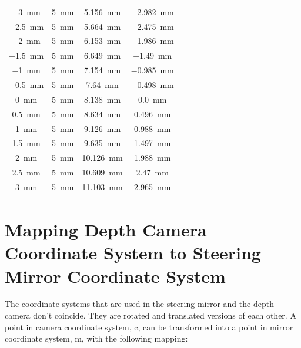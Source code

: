 \begin{table}[ht]
\begin{tabular}{| c | c | c | c |}
        \SI{-3}{mm}           & \SI{5}{mm}     & \SI{5.156}{mm}      & \SI{-2.982}{mm}   \\
        \SI{-2.5}{mm}         & \SI{5}{mm}     & \SI{5.664}{mm}      & \SI{-2.475}{mm}   \\
        \SI{-2}{mm}           & \SI{5}{mm}     & \SI{6.153}{mm}      & \SI{-1.986}{mm}   \\
        \SI{-1.5}{mm}         & \SI{5}{mm}     & \SI{6.649}{mm}      & \SI{-1.49}{mm}    \\
        \SI{-1}{mm}           & \SI{5}{mm}     & \SI{7.154}{mm}      & \SI{-0.985}{mm}   \\
        \SI{-0.5}{mm}         & \SI{5}{mm}     & \SI{7.64}{mm}       & \SI{-0.498}{mm}   \\
        \SI{0}{mm}            & \SI{5}{mm}     & \SI{8.138}{mm}      & \SI{0.0}{mm}      \\
        \SI{0.5}{mm}          & \SI{5}{mm}     & \SI{8.634}{mm}      & \SI{0.496}{mm}    \\
        \SI{1}{mm}            & \SI{5}{mm}     & \SI{9.126}{mm}      & \SI{0.988}{mm}    \\
        \SI{1.5}{mm}          & \SI{5}{mm}     & \SI{9.635}{mm}      & \SI{1.497}{mm}    \\
        \SI{2}{mm}            & \SI{5}{mm}     & \SI{10.126}{mm}     & \SI{1.988}{mm}    \\
        \SI{2.5}{mm}          & \SI{5}{mm}     & \SI{10.609}{mm}     & \SI{2.47}{mm}     \\
        \SI{3}{mm}            & \SI{5}{mm}     & \SI{11.103}{mm}     & \SI{2.965}{mm}    \\
        \hline
    \end{tabular}
    \label{tab:d225}
\end{table}



\section{Mapping Depth Camera Coordinate System to Steering Mirror Coordinate System}
\label{sec:Mapping Depth Camera Coordinate System to Steering Mirror Coordinate System}


The coordinate systems that are used in the steering
mirror and the depth camera don't coincide. They are
rotated and translated versions of each other. A point
in camera coordinate system, c, can be transformed into
a point in mirror coordinate system, m, with the following mapping:

